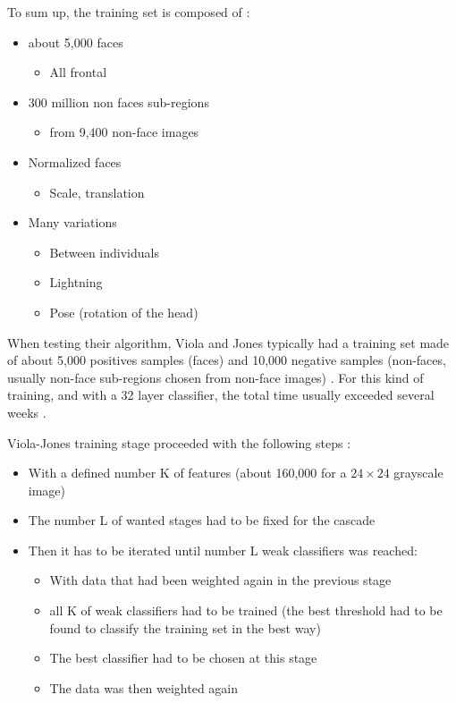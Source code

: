 \noindent To sum up, the training set is composed of \cite{UBC01}:

\begin{itemize}
  \item about 5,000 faces
  \begin{itemize}
  	\item All frontal
  \end{itemize}
  \item 300 million non faces sub-regions
  \begin{itemize}
  	\item from 9,400 non-face images
  \end{itemize}
  \item Normalized faces
  \begin{itemize}
  	\item Scale, translation
  \end{itemize}
  \item Many variations
  \begin{itemize}
  	\item Between individuals
	\item Lightning
	\item Pose (rotation of the head)
  \end{itemize}
\end{itemize}

\vspace{\baselineskip}
\noindent When testing their algorithm, Viola and Jones typically had a training set made of about 5,000 positives samples (faces) and 10,000 negative samples (non-faces, usually non-face sub-regions chosen from non-face images) \cite{DIN08}. For this kind of training, and with a 32 layer classifier, the total time usually exceeded several weeks \cite{VIO01}.
\newline

\noindent Viola-Jones training stage proceeded with the following steps \cite{DIN08}:

\begin{itemize}
  \item With a defined number K of features (about 160,000 for a $ 24\times24 $ grayscale image)
  \item The number L of wanted stages had to be fixed for the cascade
  \item Then it has to be iterated until number L weak classifiers was reached:
  \begin{itemize}
  	\item With data that had been weighted again in the previous stage
	\item all K of weak classifiers had to be trained (the best threshold had to be found to classify the training set in the best way)
	\item The best classifier had to be chosen at this stage
	\item The data was then weighted again
  \end{itemize}
\end{itemize}

